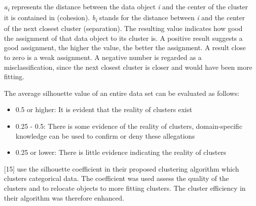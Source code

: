   \textit{a\textsubscript{i}} represents the distance between the data object \textit{i} and the center of the cluster it is contained in (cohesion). \textit{b\textsubscript{i}} stands for the distance between \textit{i} and the center of the next closest cluster (separation). The resulting value indicates how good the assignment of that data object to its cluster is. A positive result suggests a good assignment, the higher the value, the better the assignment. A result close to zero is a weak assignment. A negative number is regarded as a misclassification, since the next closest cluster is closer and would have been more fitting. 

  The average silhouette value of an entire data set can be evaluated as follows:
  \begin{itemize}
    \item 0.5 or higher: It is evident that the reality of clusters exist
    \item 0.25 - 0.5: There is some evidence of the reality of clusters, domain-specific knowledge can be used to confirm or deny these allegations
    \item 0.25 or lower: There is little evidence indicating the reality of clusters
  \end{itemize}


\textcite{silhouetteRelocatingMeasure}[15] use the silhouette coefficient in their proposed clustering algorithm which clusters categorical data. The coefficient was used assess the quality of the clusters and to relocate objects to more fitting clusters. The cluster efficiency in their algorithm was therefore enhanced.